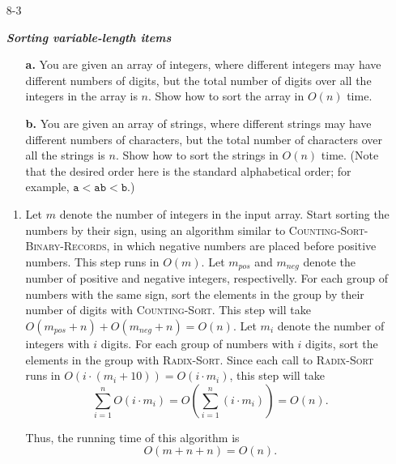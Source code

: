 \begin{enumerate}
\begin{framed}
\begin{enumerate}
\end{enumerate}
\end{framed}

\newpage

\item[8-3]{\textbf{\emph{Sorting variable-length items}}
\begin{enumerate}
\item[\textbf{a.}]{You are given an array of integers, where different integers
may have different numbers of digits, but the total number of digits over all
the integers in the array is $n$. Show how to sort the array in $O(n)$ time.}
\item[\textbf{b.}]{You are given an array of strings, where different strings
may have different numbers of characters, but the total number of characters
over all the strings is $n$. Show how to sort the strings in $O(n)$ time.
(Note that the desired order here is the standard alphabetical order; for
example, $\texttt{a} < \texttt{ab} < \texttt{b}$.)}
\end{enumerate}
}

\begin{framed}
\begin{enumerate}
\item Let $m$ denote the number of integers in the input array. Start sorting
the numbers by their sign, using an algorithm similar to
\textsc{Counting-Sort-Binary-Records}, in which negative numbers are placed
before positive numbers. This step runs in $O(m)$. Let $m_{pos}$ and $m_{neg}$
denote the number of positive and negative integers, respectivelly. For each
group of numbers with the same sign, sort the elements in the group by their
number of digits with \textsc{Counting-Sort}. This step will take $O(m_{pos}
+ n) + O(m_{neg} + n) = O(n)$. Let $m_i$ denote the number of integers with $i$
digits. For each group of numbers with $i$ digits, sort the elements in the
group with \textsc{Radix-Sort}. Since each call to \textsc{Radix-Sort} runs in
$O(i \cdot (m_i + 10)) = O(i \cdot m_i)$, this step will take
\[
  \sum_{i = 1}^{n} O(i \cdot m_i)
  = O\left( \sum_{i = 1}^{n} (i \cdot m_i) \right)
  = O(n).
\]

Thus, the running time of this algorithm is
\[
  O(m + n + n) = O(n).
\]


\end{enumerate}
\end{framed}
\end{enumerate}
